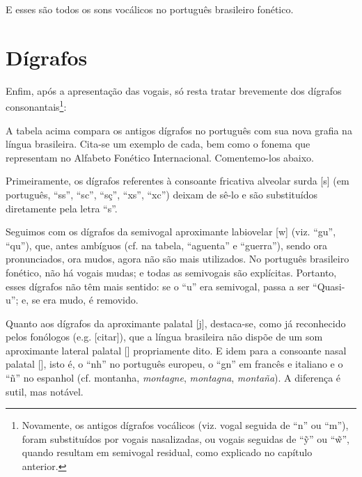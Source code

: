 \documentclass[12pt, a5paper, titlepage]{article}
\begin{document}
\begin{bilingualpages}
    E esses são todos os sons vocálicos no português brasileiro fonético.



    \section{Dígrafos}\label{pt.section.digraphs}
    Enfim, após a apresentação das vogais, só resta tratar brevemente dos dígrafos consonantais\footnote{
        Novamente, os antigos dígrafos vocálicos (viz. vogal seguida de ``n'' ou ``m''), foram substituídos por vogais nasalizadas, ou vogais seguidas de ``\~y'' ou ``\~w'', quando resultam em semivogal residual, como explicado no capítulo anterior.
    }:

    \PtTableDigraphs

    A tabela acima compara os antigos dígrafos no português com sua nova grafia na língua brasileira. Cita-se um exemplo de cada, bem como o fonema que representam no Alfabeto Fonético Internacional. Comentemo-los abaixo.

    Primeiramente, os dígrafos referentes à consoante fricativa alveolar surda [s] (em português, ``ss'', ``sc'', ``sç'', ``xs'', ``xc'') deixam de sê-lo e são substituídos diretamente pela letra ``s''.

    Seguimos com os dígrafos da semivogal aproximante labiovelar [w] (viz. ``gu'', ``qu''), que, antes ambíguos (cf. na tabela,   ``aguenta'' e ``guerra''), sendo ora pronunciados, ora mudos, agora não são mais utilizados. No português brasileiro fonético, não há vogais mudas; e todas as semivogais são explícitas. Portanto, esses dígrafos não têm mais sentido: se o ``u'' era semivogal, passa a ser ``Quasi-u''; e, se era mudo, é removido.

    Quanto aos dígrafos da aproximante palatal [j], destaca-se, como já reconhecido pelos fonólogos (e.g. [citar]), que a língua brasileira não dispõe de um som aproximante lateral palatal [\textturny] propriamente dito. E idem para a consoante nasal palatal [\textltailn], isto é, o ``nh'' no português europeu, o ``gn'' em francês e italiano e o ``ñ'' no espanhol (cf. 
    montanha, \textit{montagne}, \textit{montagna}, \textit{montaña}). A diferença é sutil, mas notável.
    

\end{bilingualpages}
\end{document}
